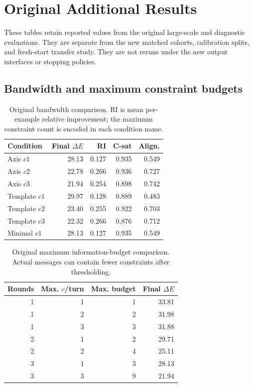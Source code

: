 \section{Original Additional Results}
\label{app:original-results}
These tables retain reported values from the original large-scale and
diagnostic evaluations. They are separate from the new matched cohorts,
calibration splits, and fresh-start transfer study. They are not reruns
under the new output interfaces or stopping policies.

\subsection{Bandwidth and maximum constraint budgets}
\begin{table}[H]
\centering\small
\begin{tabular}{@{}lrrrr@{}}
\toprule
Condition & Final $\Delta E$ & RI & C-sat & Align. \\
\midrule
Axis $c1$ & 28.13 & 0.127 & 0.935 & 0.549 \\
Axis $c2$ & 22.78 & 0.266 & 0.936 & 0.727 \\
Axis $c3$ & 21.94 & 0.254 & 0.898 & 0.742 \\
Template $c1$ & 29.97 & 0.128 & 0.889 & 0.483 \\
Template $c2$ & 23.40 & 0.255 & 0.922 & 0.703 \\
Template $c3$ & 22.32 & 0.266 & 0.876 & 0.712 \\
Minimal $c1$ & 28.13 & 0.127 & 0.935 & 0.549 \\
\bottomrule
\end{tabular}
\caption{Original bandwidth comparison. RI is mean per-example relative
improvement; the maximum constraint count is encoded in each condition name.}
\end{table}

\begin{table}[H]
\centering\small
\begin{tabular}{@{}rrrr@{}}
\toprule
Rounds & Max. $c$/turn & Max. budget & Final $\Delta E$ \\
\midrule
1 & 1 & 1 & 33.81 \\
1 & 2 & 2 & 31.98 \\
1 & 3 & 3 & 31.88 \\
2 & 1 & 2 & 29.71 \\
2 & 2 & 4 & 25.11 \\
3 & 1 & 3 & 28.13 \\
3 & 3 & 9 & 21.94 \\
\bottomrule
\end{tabular}
\caption{Original maximum information-budget comparison. Actual messages
can contain fewer constraints after thresholding.}
\end{table}

